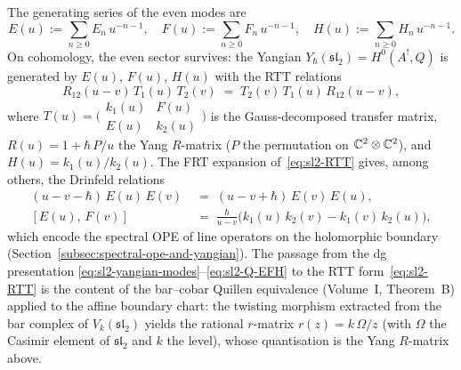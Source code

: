 The generating series of the even modes are
\begin{equation}\label{eq:sl2-dual-generators}
E(u) := \sum_{n \ge 0} E_n\, u^{-n-1},
\quad
F(u) := \sum_{n \ge 0} F_n\, u^{-n-1},
\quad
H(u) := \sum_{n \ge 0} H_n\, u^{-n-1}.
\end{equation}
On cohomology, the even sector survives: the Yangian
$Y_\hbar(\mathfrak{sl}_2) = H^0(A^!, Q)$ is
generated by $E(u)$, $F(u)$, $H(u)$ with the
RTT relations
\begin{equation}\label{eq:sl2-RTT}
R_{12}(u - v)\, T_1(u)\, T_2(v)
\;=\;
T_2(v)\, T_1(u)\, R_{12}(u - v),
\end{equation}
where $T(u) = \bigl(\begin{smallmatrix}
k_1(u) & F(u) \\ E(u) & k_2(u)
\end{smallmatrix}\bigr)$ is the Gauss-decomposed
transfer matrix, $R(u) = 1 + \hbar\, P/u$ the
Yang $R$-matrix ($P$ the permutation on
$\mathbb{C}^2 \otimes \mathbb{C}^2$), and
$H(u) = k_1(u)/k_2(u)$.
The FRT expansion of~\eqref{eq:sl2-RTT} gives, among
others, the Drinfeld relations
\begin{align}
(u - v - \hbar)\, E(u)\, E(v)
&\;=\;
(u - v + \hbar)\, E(v)\, E(u),
\label{eq:cs-drinfeld-EE}
\\[3pt]
[E(u),\, F(v)]
&\;=\;
\frac{\hbar}{u - v}
\bigl(k_1(u)\, k_2(v) - k_1(v)\, k_2(u)\bigr),
\label{eq:cs-drinfeld-EF}
\end{align}
which encode the spectral OPE of line operators
on the holomorphic boundary
(Section~\ref{subsec:spectral-ope-and-yangian}).
The passage from the dg presentation
\eqref{eq:sl2-yangian-modes}--\eqref{eq:sl2-Q-EFH}
to the RTT form~\eqref{eq:sl2-RTT} is the
content of the bar--cobar Quillen equivalence
(Volume~I, Theorem~B) applied to the affine
boundary chart: the twisting morphism extracted
from the bar complex of $V_k(\mathfrak{sl}_2)$
yields the rational $r$-matrix
$r(z) = k\,\Omega/z$ (with $\Omega$ the Casimir
element of $\mathfrak{sl}_2$ and $k$ the level), whose quantisation
is the Yang $R$-matrix above.

